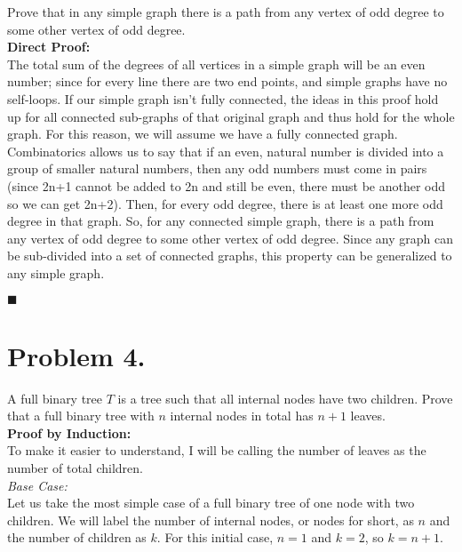 \documentclass[11pt]{article}
\begin{document}
\noindent
Prove that in any simple graph there is a path from any vertex of odd degree to some other vertex of odd degree. \\

{\bf Direct Proof: }\\
The total sum of the degrees of all vertices in a simple graph will be an even number; since for every line there are two end points, and simple graphs have no self-loops. If our simple graph isn't fully connected, the ideas in this proof hold up for all connected sub-graphs of that original graph and thus hold for the whole graph. For this reason, we will assume we have a fully connected graph. Combinatorics allows us to say that if an even, natural number is divided into a group of smaller natural numbers, then any odd numbers must come in pairs (since 2n+1 cannot be added to 2n and still be even, there must be another odd so we can get 2n+2). Then, for every odd degree, there is at least one more odd degree in that graph. So, for any connected simple graph, there is a path from any vertex of odd degree to some other vertex of odd degree. Since any graph can be sub-divided into a set of connected graphs, this property can be generalized to any simple graph.
\begin{flushright}$\blacksquare$\end{flushright}



\newpage

\section*{Problem 4.}

A full binary tree $T$ is a tree such that all internal nodes have two children. Prove that a full binary tree with $n$ internal nodes in total has $n+1$ leaves.\\

{\bf Proof by Induction: }\\

To make it easier to understand, I will be calling the number of leaves as the number of total children.\\

\noindent
{\em Base Case:} \\
Let us take the most simple case of a full binary tree of one node with two children. We will label the number of internal nodes, or nodes for short, as $n$ and the number of children as $k$. For this initial case, $n = 1$ and $k = 2$, so $k = n+1$. \\
\end{document}
